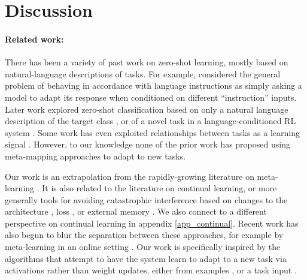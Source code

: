 \documentclass{article}
\begin{document}
\vspace{-0.5em}
\section{Discussion} \label{sec_discussion}
\vspace{-0.5em} %
\paragraph{Related work:} There has been a variety of past work on zero-shot learning, mostly based on natural-language descriptions of tasks. For example, \citet{Larochelle2008} considered the general problem of behaving in accordance with language instructions as simply asking a model to adapt its response when conditioned on different ``instruction'' inputs. Later work explored zero-shot classification based on only a natural language description of the target class \citep{Socher2013,Romera-Paredes2015,Xian2018}, or of a novel task in a language-conditioned RL system \citep{Hermann2017}. Some work has even exploited relationships between tasks as a learning signal \citep{Oh2017a, Pal2019}. However, to our knowledge none of the prior work has proposed using meta-mapping approaches to adapt to new tasks. \par
Our work is an extrapolation from the rapidly-growing literature on meta-learning \citep[e.g.][]{Vinyals2016, Santoro2016, Finn2017a, Finn2018, Stadie2018, Botvinick2019}. It is also related to the literature on continual learning, or more generally tools for avoiding catastrophic interference based on changes to the architecture \citep[e.g.][]{Fernando2017, Rusu2016}, loss \citep[e.g.][]{Kirkpatrick2016, Zenke2017, Aljundi2019}, or external memory \citep[e.g.][]{Sprechmann2018}. We also connect to a different perspective on continual learning in appendix \ref{app_continual}. Recent work has also begun to blur the separation between these approaches, for example by meta-learning in an online setting \citep{Finn2019}. Our work is specifically inspired by the algorithms that attempt to have the system learn to adapt to a new task via activations rather than weight updates, either from examples \citep[e.g.][]{Wang2016a, Duan2016}, or a task input \citep[e.g.][]{Borsa2019}. \par
\end{document}
